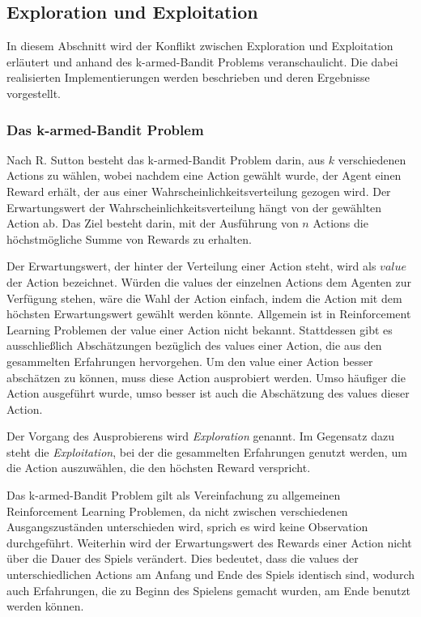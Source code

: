 \documentclass[11pt]{scrartcl}
\begin{document}
\subsection{Exploration und Exploitation}
In diesem Abschnitt wird der Konflikt zwischen Exploration und Exploitation erläutert und
anhand des k-armed-Bandit Problems veranschaulicht. Die dabei realisierten
Implementierungen werden beschrieben und deren Ergebnisse vorgestellt.


\subsubsection{Das k-armed-Bandit Problem}
Nach R. Sutton \cite[~S.26]{SB1998} besteht das k-armed-Bandit Problem darin, aus $k$
verschiedenen Actions zu wählen, wobei nachdem eine Action gewählt wurde, der Agent einen
Reward erhält, der aus einer Wahrscheinlichkeitsverteilung gezogen wird. Der
Erwartungswert der Wahrscheinlichkeitsverteilung hängt von der gewählten Action ab. Das
Ziel besteht darin, mit der Ausführung von $n$ Actions die höchstmögliche Summe von Rewards
zu erhalten.

Der Erwartungswert, der hinter der Verteilung einer Action steht, wird als $value$ der Action
bezeichnet. Würden die values der einzelnen Actions dem Agenten zur Verfügung stehen, wäre die 
Wahl der Action einfach, indem die Action mit dem höchsten Erwartungswert gewählt werden 
könnte. Allgemein ist in Reinforcement Learning Problemen der value einer Action nicht bekannt.
Stattdessen gibt es ausschließlich Abschätzungen bezüglich des values einer Action, die aus den
gesammelten Erfahrungen hervorgehen. Um den value einer Action besser abschätzen zu können,
muss diese Action ausprobiert werden. Umso häufiger die Action ausgeführt wurde, umso besser
ist auch die Abschätzung des values dieser Action.

Der Vorgang des Ausprobierens wird \textit{Exploration} genannt. Im Gegensatz dazu steht die
\textit{Exploitation}, bei der die gesammelten Erfahrungen genutzt werden, um die Action
auszuwählen, die den höchsten Reward verspricht.

Das k-armed-Bandit Problem gilt als Vereinfachung zu allgemeinen Reinforcement Learning
Problemen, da nicht zwischen verschiedenen Ausgangszuständen unterschieden wird, sprich
es wird keine Observation durchgeführt. Weiterhin wird der Erwartungswert des
Rewards einer Action nicht über die Dauer des Spiels verändert. Dies bedeutet, dass die
values der unterschiedlichen Actions am Anfang und Ende des Spiels identisch sind, wodurch
auch Erfahrungen, die zu Beginn des Spielens gemacht wurden, am Ende benutzt werden
können.
\end{document}

